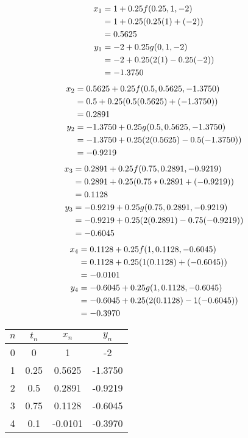 		\begin{align}
			x_{1} &= 1 + 0.25f(0.25,1,-2)& \notag \\
			&= 1 + 0.25(0.25(1) + (-2))& \notag \\
			&= 0.5625& \\
			y_{1} &= -2 + 0.25g(0,1,-2)& \notag \\
			&= -2 + 0.25(2(1) - 0.25(-2))& \notag \\
			&= -1.3750&
		\end{align}
		\begin{align}
			x_{2} &= 0.5625 + 0.25f(0.5,0.5625,-1.3750)& \notag \\
			&= 0.5 + 0.25(0.5(0.5625) + (-1.3750))& \notag \\
			&= 0.2891& \\
			y_{2} &= -1.3750 + 0.25g(0.5,0.5625,-1.3750)& \notag \\
			&= -1.3750 + 0.25(2(0.5625) - 0.5(-1.3750))& \notag \\
			&= -0.9219&
		\end{align}
		\begin{align}
			x_{3} &= 0.2891 + 0.25f(0.75,0.2891,-0.9219)& \notag \\
			&= 0.2891 + 0.25(0.75*0.2891 + (-0.9219))& \notag \\
			&= 0.1128& \\
			y_{3} &= -0.9219 + 0.25g(0.75,0.2891,-0.9219)& \notag \\
			&= -0.9219 + 0.25(2(0.2891) - 0.75(-0.9219))& \notag \\
			&= -0.6045&
		\end{align}
		\begin{align}
			x_{4} &= 0.1128 + 0.25f(1,0.1128,-0.6045)& \notag \\
			&= 0.1128 + 0.25(1(0.1128) + (-0.6045))& \notag \\
			&= -0.0101& \\
			y_{4} &= -0.6045 + 0.25g(1,0.1128,-0.6045)& \notag \\
			&= -0.6045 + 0.25(2(0.1128) - 1(-0.6045))& \notag \\
			&= -0.3970&
		\end{align}

		\begin{table}[H]
			\centering
			\begin{tabular}{|c|c|c|c|}
				\hline
				$n$ & $t_{n}$ & $x_{n}$ & $y_{n}$ \\ \hline
				0 & 0 & 1 & -2 \\ \hline
				1 & 0.25 & 0.5625 & -1.3750 \\ \hline
				2 & 0.5 & 0.2891 & -0.9219 \\ \hline
				3 & 0.75 & 0.1128 & -0.6045 \\ \hline
				4 & 0.1 & -0.0101 & -0.3970 \\ \hline
			\end{tabular}
		\end{table}

